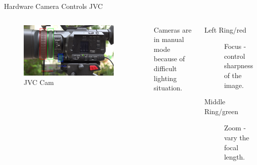 \documentclass[aspectratio=169]{beamer}
\begin{document}
\begin{frame}{Hardware Camera Controls JVC}
	\begin{columns}[T,onlytextwidth]
	\begin{figure} 
		\centering
		\includegraphics[width=0.9\textwidth]{images/jvc_seitenansicht_objektiv.png}
		\caption{JVC Cam}
	\end{figure}
		Cameras are in manual mode because of difficult lighting situation.
		\begin{description}
			\item[Left Ring/red] Focus - control sharpness of the image.
			\item[Middle Ring/green] Zoom - vary the focal length.
		\end{description}
	\end{columns}
\end{frame}

\end{document}
